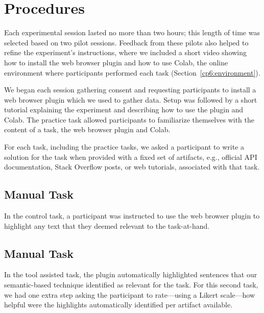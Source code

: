 
\section{Procedures}
\label{cp6:procedures}





Each experimental session lasted no more than two hours; this length of time was selected based on two pilot sessions. 
Feedback from these pilots also helped to refine the experiment's instructions, where we included a short video showing how to install the web browser plugin and how to use Colab, the online environment where participants performed each task (Section~\ref{cp6:environment}).






We began each session gathering consent and requesting participants to install a web browser plugin which we used to gather data.
Setup was followed by a short tutorial explaining the experiment and describing how to use the plugin and Colab. 
The practice task allowed participants to familiarize themselves with the content of a task, the web browser plugin and Colab. 



For each task, including the practice tasks, we asked a participant to write a solution for the task
when provided with a fixed set of artifacts, e.g., official API documentation, Stack Overflow posts, or web tutorials, 
associated with that task.  


\subsection{Manual Task}



In the control task, a participant was instructed to use the web browser plugin to highlight any text that they deemed relevant to the task-at-hand. 

\subsection{Manual Task}

In the tool assisted task, the plugin automatically highlighted sentences that our semantic-based technique identified as relevant for the task. 
For this second task, we had one extra step asking the participant to rate---using a Likert scale---how helpful were the highlights automatically identified per artifact available. 



